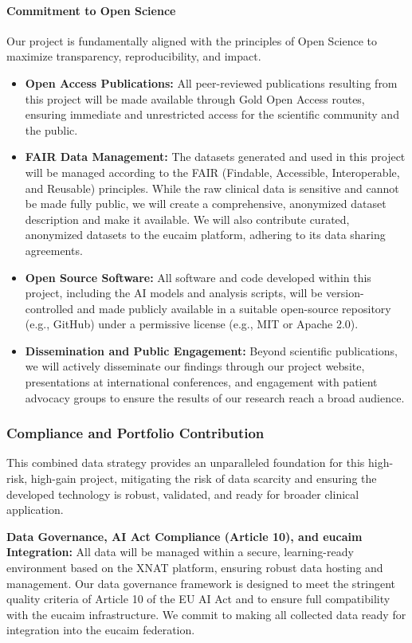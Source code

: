 \documentclass[11pt, a4paper]{article}
\begin{document}
\paragraph{Commitment to Open Science}
Our project is fundamentally aligned with the principles of Open Science to maximize transparency, reproducibility, and impact.
\begin{itemize}
    \item \textbf{Open Access Publications:} All peer-reviewed publications resulting from this project will be made available through Gold Open Access routes, ensuring immediate and unrestricted access for the scientific community and the public.
    \item \textbf{FAIR Data Management:} The datasets generated and used in this project will be managed according to the FAIR (Findable, Accessible, Interoperable, and Reusable) principles. While the raw clinical data is sensitive and cannot be made fully public, we will create a comprehensive, anonymized dataset description and make it available. We will also contribute curated, anonymized datasets to the \gls{eucaim} platform, adhering to its data sharing agreements.
    \item \textbf{Open Source Software:} All software and code developed within this project, including the AI models and analysis scripts, will be version-controlled and made publicly available in a suitable open-source repository (e.g., GitHub) under a permissive license (e.g., MIT or Apache 2.0).
    \item \textbf{Dissemination and Public Engagement:} Beyond scientific publications, we will actively disseminate our findings through our project website, presentations at international conferences, and engagement with patient advocacy groups to ensure the results of our research reach a broad audience.
\end{itemize}

\subsubsection{Compliance and Portfolio Contribution}
This combined data strategy provides an unparalleled foundation for this high-risk, high-gain project, mitigating the risk of data scarcity and ensuring the developed technology is robust, validated, and ready for broader clinical application.

\textbf{Data Governance, AI Act Compliance (Article 10), and \gls{eucaim} Integration:} All data will be managed within a secure, learning-ready environment based on the XNAT platform, ensuring robust data hosting and management. Our data governance framework is designed to meet the stringent quality criteria of Article 10 of the EU AI Act and to ensure full compatibility with the \gls{eucaim} infrastructure. We commit to making all collected data ready for integration into the \gls{eucaim} federation.
\end{document}
